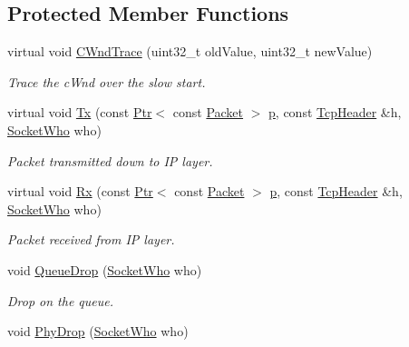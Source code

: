 \subsection*{Protected Member Functions}
\begin{DoxyCompactItemize}
\item 
virtual void \hyperlink{classTcpSlowStartNormalTest_afb8a38b1e691a4aedd12c6e6b40e0bd9}{C\+Wnd\+Trace} (uint32\+\_\+t old\+Value, uint32\+\_\+t new\+Value)
\begin{DoxyCompactList}\small\item\em Trace the c\+Wnd over the slow start. \end{DoxyCompactList}\item 
virtual void \hyperlink{classTcpSlowStartNormalTest_a3373d898f7c9153df0c042efad58e588}{Tx} (const \hyperlink{classns3_1_1Ptr}{Ptr}$<$ const \hyperlink{classns3_1_1Packet}{Packet} $>$ \hyperlink{lte__link__budget__x2__handover__measures_8m_ac9de518908a968428863f829398a4e62}{p}, const \hyperlink{classns3_1_1TcpHeader}{Tcp\+Header} \&h, \hyperlink{classns3_1_1TcpGeneralTest_a29338e6b7137cad650c2ff835713f6ee}{Socket\+Who} who)
\begin{DoxyCompactList}\small\item\em Packet transmitted down to IP layer. \end{DoxyCompactList}\item 
virtual void \hyperlink{classTcpSlowStartNormalTest_a4d83767db2bb54c0e75f5706d27883b9}{Rx} (const \hyperlink{classns3_1_1Ptr}{Ptr}$<$ const \hyperlink{classns3_1_1Packet}{Packet} $>$ \hyperlink{lte__link__budget__x2__handover__measures_8m_ac9de518908a968428863f829398a4e62}{p}, const \hyperlink{classns3_1_1TcpHeader}{Tcp\+Header} \&h, \hyperlink{classns3_1_1TcpGeneralTest_a29338e6b7137cad650c2ff835713f6ee}{Socket\+Who} who)
\begin{DoxyCompactList}\small\item\em Packet received from IP layer. \end{DoxyCompactList}\item 
void \hyperlink{classTcpSlowStartNormalTest_a539ecfe4d608dfea4a1c0e190f0f9331}{Queue\+Drop} (\hyperlink{classns3_1_1TcpGeneralTest_a29338e6b7137cad650c2ff835713f6ee}{Socket\+Who} who)
\begin{DoxyCompactList}\small\item\em Drop on the queue. \end{DoxyCompactList}\item 
void \hyperlink{classTcpSlowStartNormalTest_a781819cfb6a92f1b0c72d58549187070}{Phy\+Drop} (\hyperlink{classns3_1_1TcpGeneralTest_a29338e6b7137cad650c2ff835713f6ee}{Socket\+Who} who)

\end{DoxyCompactItemize}

